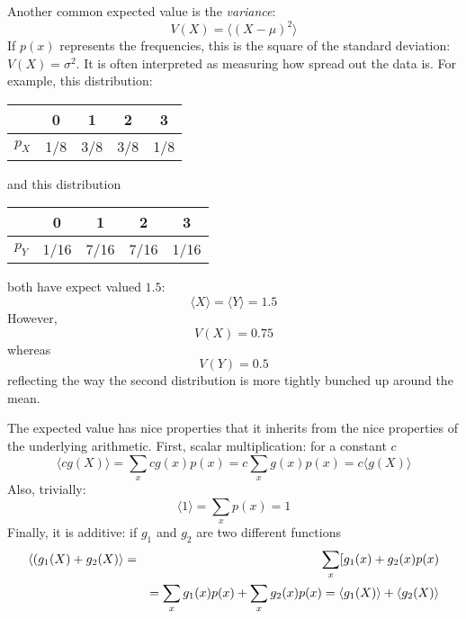 \documentclass[11pt,a4paper]{scrartcl}
\begin{document}
Another common expected value is the \textsl{variance}:
\begin{equation}
V(X)=\langle (X-\mu)^2\rangle
\end{equation}
If $p(x)$ represents the frequencies, this is the square of the
standard deviation: $V(X)=\sigma^2$. It is often interpreted as measuring how spread out the data is. For example, this distribution:
\begin{center}
\begin{tabular}{c|cccc}
&0&1&2&3\\
\hline
$p_X$&1/8&3/8&3/8&1/8
\end{tabular}
\end{center}
and this distribution
\begin{center}
\begin{tabular}{c|cccc}
&0&1&2&3\\
\hline
$p_Y$&1/16&7/16&7/16&1/16
\end{tabular}
\end{center}
both have expect valued $1.5$:
\begin{equation}
\langle X\rangle = \langle Y\rangle = 1.5
\end{equation}
However,
\begin{equation}
V(X)=0.75
\end{equation}
whereas 
\begin{equation}
V(Y)=0.5
\end{equation}
reflecting the way the second distribution is more tightly bunched up
around the mean.

The expected value has nice properties that it inherits from the nice
properties of the underlying arithmetic. First, scalar multiplication:
for a constant $c$
\begin{equation}
\langle c g(X)\rangle =\sum_x cg(x)p(x)=c\sum_x g(x)p(x)=c\langle g(X)\rangle
\end{equation}
Also, trivially:
\begin{equation}
\langle 1\rangle=\sum_x p(x)=1
\end{equation}
Finally, it is additive: if $g_1$ and $g_2$ are two different
functions
\begin{eqnarray}
\langle (g_1(X)+g_2(X)\rangle &=&\sum_x [g_1(x)+g_2(x)p(x)\cr
&&=\sum_x g_1(x)p(x)+\sum_x g_2(x)p(x)=\langle g_1(X)\rangle+\langle g_2(X)\rangle
\end{eqnarray}
\end{document}
